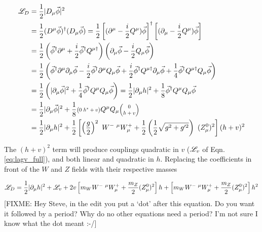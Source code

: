     \begin{equation} \begin{split}
        \Lag_D &= \frac{1}{2} |D_{\mu} \vec{\phi}|^2
            \\&= \frac{1}{2} (D^{\mu} \vec{\phi})^\dag (D_{\mu} \vec{\phi})
                = \frac{1}{2} \left[(\partial^{\mu} - \frac{i}{2}Q^{\mu}) \vec{\phi}\right]^\dag
                \left[(\partial_{\mu} - \frac{i}{2}Q^{\mu}) \vec{\phi}\right]
            \\&= \frac{1}{2} \left(\vec{\phi}^\dag \partial^{\mu} + \frac{i}{2} \vec{\phi}^\dag Q^{\mu \dag} \right)
                \left(\partial_{\mu}\vec{\phi} - \frac{i}{2}Q_{\mu}\vec{\phi} \right)
            \\&= \frac{1}{2} \left(
                \vec{\phi}^\dag \partial^{\mu} \partial_{\mu}\vec{\phi}
                - \frac{i}{2} \vec{\phi}^\dag \partial^{\mu} Q_{\mu}\vec{\phi}
                + \frac{i}{2} \vec{\phi}^\dag Q^{\mu \dag} \partial_{\mu}\vec{\phi}
                + \frac{1}{4} \vec{\phi}^\dag Q^{\mu \dag} Q_{\mu}\vec{\phi}
                \right)
            \\&= \frac{1}{2} \left(
                | \partial_{\mu}\vec{\phi} |^2
                + \frac{1}{4} \vec{\phi}^\dag Q^{\mu} Q_{\mu} \vec{\phi}
                \right)
                = \frac{1}{2} | \partial_{\mu}h |^2 + \frac{1}{8} \vec{\phi}^\dag Q^{\mu}Q_{\mu} \vec{\phi}
            \\&= \frac{1}{2} | \partial_{\mu}\vec{\phi} |^2 + \frac{1}{8} 
                    \minimatrix{0 & h^* + v} Q^{\mu}
                    Q_{\mu} \minimatrix{0 \\ h + v}
            \\&= \frac{1}{2} | \partial_{\mu}h |^2
                + \frac{1}{2} \left[ \left(\frac{g}{2}\right)^2\  W^{-\ \mu} W^+_{\mu}
                + \frac{1}{2} \left(\frac{1}{2}\sqrt{g^2 + g^{\prime 2}}\right)\ (Z^0_{\mu})^2 \right] (h+v)^2
    \end{split} \end{equation}

    The $(h+v)^2$ term will produce couplings quadratic in $v$ ($\mathscr{L}_v$ of Eqn. \ref{eq:lagv_full}), and both linear and quadratic in $h$.
    Replacing the coefficients in front of the $W$ and $Z$ fields with their respective masses

    \begin{equation} \begin{split}
        \mathscr{L}_D = \frac{1}{2} | \partial_{\mu}h |^2 + \mathscr{L}_v
            + 2v\left[ m_W W^{-\ \mu} W^+_{\mu} + \frac{m_Z}{2} (Z^0_{\mu})^2 \right] h
            + \left[ m_W W^{-\ \mu} W^+_{\mu} + \frac{m_Z}{2} (Z^0_{\mu})^2 \right] h^2
    \end{split} \end{equation}
    [FIXME: Hey Steve, in the edit you put a `dot' after this equation.
    Do you want it followed by a period? Why do no other equations need a period?
    I'm not sure I know what the dot meant :-/]

